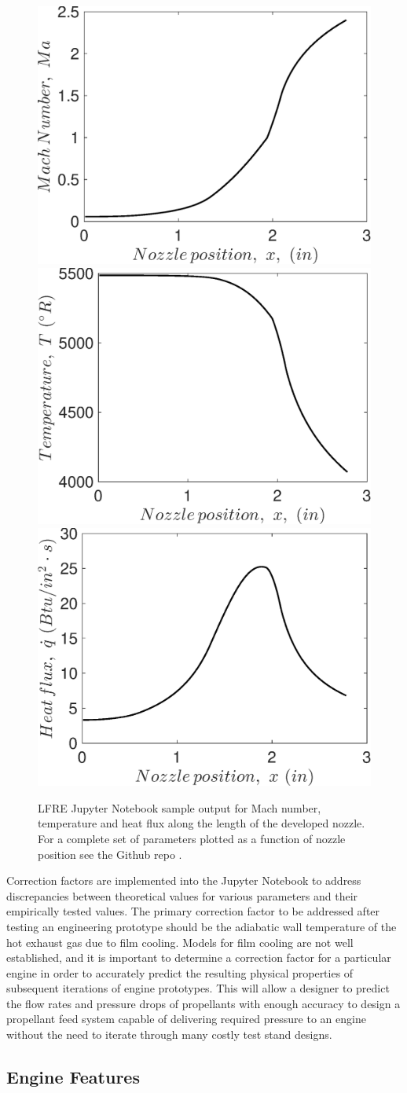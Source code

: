 \documentclass[]{aiaa-tc}%
\begin{document}
\begin{figure}[ht]
\centering
   {\includegraphics[width=.3\textwidth]{figures/mach}
    \includegraphics[width=.3\textwidth]{figures/temp}
    \includegraphics[width=.3\textwidth]{figures/hx}}
    \caption{LFRE Jupyter Notebook sample output for Mach number, temperature and heat flux along the length of the developed nozzle. For a complete set of parameters plotted as a function of nozzle position see the Github repo \cite{LFRE}.}
    \label{fig:propertygraphs}
\end{figure}


Correction factors are implemented into the Jupyter Notebook to address discrepancies between theoretical values for various parameters and their empirically tested values. The primary correction factor to be addressed after testing an engineering prototype should be the adiabatic wall temperature of the hot exhaust gas due to film cooling. Models for film cooling are not well established, and it is important to determine a correction factor for a particular engine in order to accurately predict the resulting physical properties of subsequent iterations of engine prototypes. This will allow a designer to predict the flow rates and pressure drops of propellants with enough accuracy to design a propellant feed system capable of delivering required pressure to an engine without the need to iterate through many costly test stand designs.


\subsection*{Engine Features}
\end{document}
